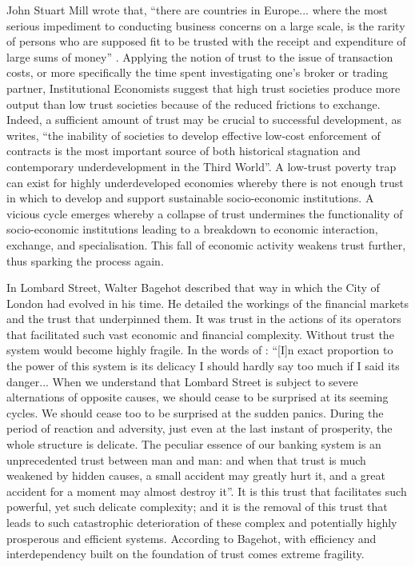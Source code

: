 \begin{subappendices}
John Stuart Mill wrote that, ``there are countries in Europe... where the most serious impediment to conducting business concerns on a large scale, is the rarity of persons who are supposed fit to be trusted with the receipt and expenditure of large sums of money'' \citep[p.~132]{Mill1848}. Applying the notion of trust to the issue of transaction costs, or more specifically the time spent investigating one's broker or trading partner, Institutional Economists suggest that high trust societies produce more output than low trust societies because of the reduced frictions to exchange. Indeed, a sufficient amount of trust may be crucial to successful development, as \citet[p.~54]{North1990} writes, ``the inability of societies to develop effective low-cost enforcement of contracts is the most important source of both historical stagnation and contemporary underdevelopment in the Third World''. A low-trust poverty trap can exist for highly underdeveloped economies whereby there is not enough trust in which to develop and support sustainable socio-economic institutions. A vicious cycle emerges whereby a collapse of trust undermines the functionality of socio-economic institutions leading to a breakdown to economic interaction, exchange, and specialisation. This fall of economic activity weakens trust further, thus sparking the process again.

In Lombard Street, Walter Bagehot described that way in which the City of London had evolved in his time. He detailed the workings of the financial markets and the trust that underpinned them. It was trust in the actions of its operators that facilitated such vast economic and financial complexity. Without trust the system would become highly fragile. In the words of \citet[p.~87--88]{Bagehot1873}: ``[I]n exact proportion to the power of this system is its delicacy I should hardly say too much if I said its danger... When we understand that Lombard Street is subject to severe alternations of opposite causes, we should cease to be surprised at its seeming cycles. We should cease too to be surprised at the sudden panics. During the period of reaction and adversity, just even at the last instant of prosperity, the whole structure is delicate. The peculiar essence of our banking system is an unprecedented trust between man and man: and when that trust is much weakened by hidden causes, a small accident may greatly hurt it, and a great accident for a moment may almost destroy it''. It is this trust that facilitates such powerful, yet such delicate complexity; and it is the removal of this trust that leads to such catastrophic deterioration of these complex and potentially highly prosperous and efficient systems. According to Bagehot, with efficiency and interdependency built on the foundation of trust comes extreme fragility.


\end{subappendices}

